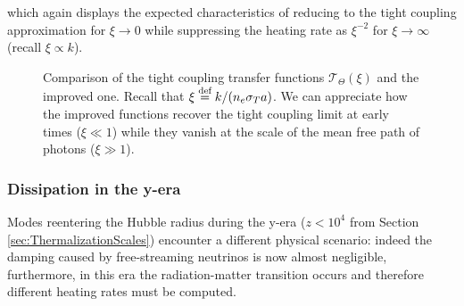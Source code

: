 which again displays the expected characteristics of reducing to the tight coupling approximation for $\xi\to0$ while suppressing the heating rate as $\xi^{-2}$ for $\xi\to\infty$ (recall $\xi\propto k$).
\begin{figure}
\centering
{}
\caption{Comparison of the tight coupling transfer functions $\mathcal{T}_\Theta(\xi)$ and the improved one. Recall that $\xi \stackrel{\text{def}}{=} k/(n_e\sigma_T a)$. We can appreciate how the improved functions recover the tight coupling limit at early times ($\xi\ll1$) while they vanish at the scale of the mean free path of photons ($\xi\gg1$).}
\label{fig:fight_coupling}
\end{figure}
\subsubsection{Dissipation in the y-era}
Modes reentering the Hubble radius during the y-era ($z<10^4$ from Section \ref{sec:ThermalizationScales}) encounter a different physical scenario: indeed the damping caused by free-streaming neutrinos is now almost negligible, furthermore, in this era the radiation-matter transition occurs and therefore different heating rates must be computed. 

